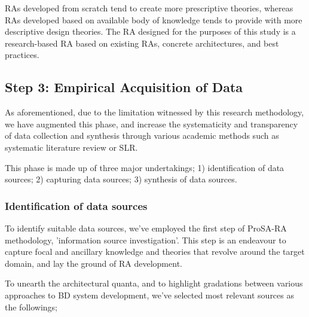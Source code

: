 \documentclass[review]{elsarticle}
\begin{document}
RAs developed from scratch tend to create more prescriptive theories, whereas RAs developed based on available body of knowledge tends to provide with more descriptive design theories. The RA designed for the purposes of this study is a research-based RA based on existing RAs, concrete architectures, and best practices. 

\subsection{Step 3: Empirical Acquisition of Data }

As aforementioned, due to the limitation witnessed by this research methodology, we have augmented this phase, and increase the systematicity and transparency of data collection and synthesis through various academic methods such as systematic literature review or SLR.

This phase is made up of three major undertakings; 1) identification of data sources; 2) capturing data sources; 3) synthesis of data sources.

\subsubsection{Identification of data sources}

To identify suitable data sources, we've employed the first step of ProSA-RA methodology, 'information source investigation'. This step is an endeavour to capture focal and ancillary knowledge and theories that revolve around the target domain, and lay the ground of RA development.

To unearth the architectural quanta, and to highlight gradations between various approaches to BD system development, we've selected most relevant sources as the followings; 
\end{document}
